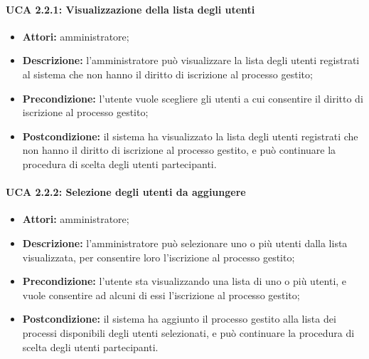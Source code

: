 \paragraph{UCA 2.2.1: Visualizzazione della lista degli utenti}
\begin{itemize}
\item \textbf{Attori:} 
amministratore;
\item \textbf{Descrizione:} 
l'amministratore può visualizzare la lista degli utenti registrati al sistema che non hanno il diritto di iscrizione al processo gestito; 
\item \textbf{Precondizione:} 
l'utente vuole scegliere gli utenti a cui consentire il diritto di iscrizione al processo gestito; 
\item \textbf{Postcondizione:} 
il sistema ha visualizzato la lista degli utenti registrati che non hanno il diritto di iscrizione al processo gestito, e può continuare la procedura di scelta degli utenti partecipanti.
\end{itemize}

\paragraph{UCA 2.2.2: Selezione degli utenti da aggiungere}
\begin{itemize}
\item \textbf{Attori:} 
amministratore;
\item \textbf{Descrizione:} 
l'amministratore può selezionare uno o più utenti dalla lista visualizzata, per consentire loro l'iscrizione al processo gestito; 
\item \textbf{Precondizione:} 
l'utente sta visualizzando una lista di uno o più utenti, e vuole consentire ad alcuni di essi l'iscrizione al processo gestito; 
\item \textbf{Postcondizione:} 
il sistema ha aggiunto il processo gestito alla lista dei processi disponibili degli utenti selezionati, e può continuare la procedura di scelta degli utenti partecipanti.
\end{itemize}

